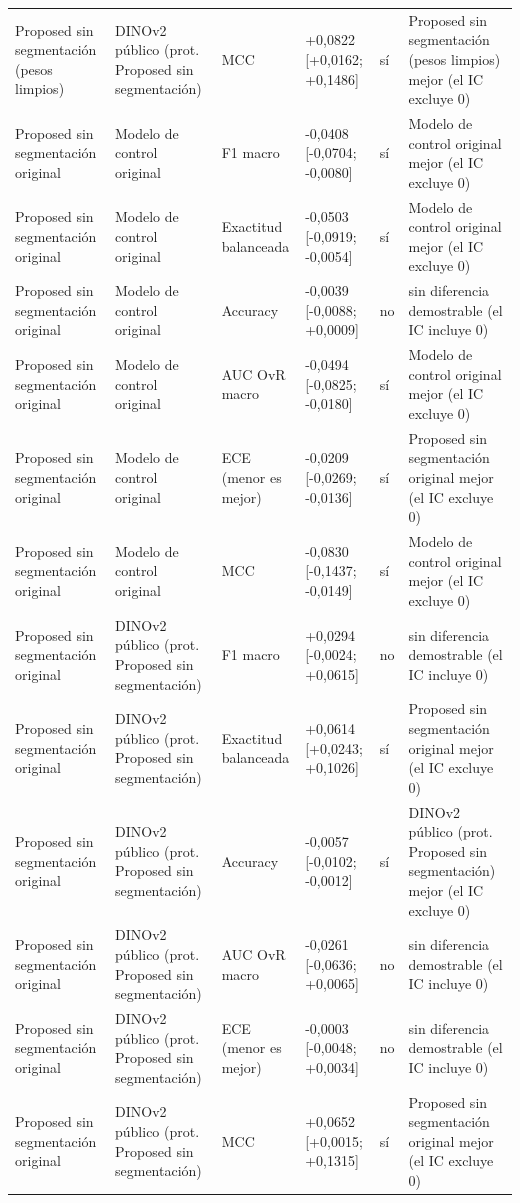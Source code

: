 \begin{longtable}{@{}llllll@{}}
Proposed sin segmentación (pesos limpios) & DINOv2 público (prot. Proposed sin segmentación) & MCC & +0,0822 [+0,0162; +0,1486] & sí & Proposed sin segmentación (pesos limpios) mejor (el IC excluye 0) \\
Proposed sin segmentación original & Modelo de control original & F1 macro & -0,0408 [-0,0704; -0,0080] & sí & Modelo de control original mejor (el IC excluye 0) \\
Proposed sin segmentación original & Modelo de control original & Exactitud balanceada & -0,0503 [-0,0919; -0,0054] & sí & Modelo de control original mejor (el IC excluye 0) \\
Proposed sin segmentación original & Modelo de control original & Accuracy & -0,0039 [-0,0088; +0,0009] & no & sin diferencia demostrable (el IC incluye 0) \\
Proposed sin segmentación original & Modelo de control original & AUC OvR macro & -0,0494 [-0,0825; -0,0180] & sí & Modelo de control original mejor (el IC excluye 0) \\
Proposed sin segmentación original & Modelo de control original & ECE (menor es mejor) & -0,0209 [-0,0269; -0,0136] & sí & Proposed sin segmentación original mejor (el IC excluye 0) \\
Proposed sin segmentación original & Modelo de control original & MCC & -0,0830 [-0,1437; -0,0149] & sí & Modelo de control original mejor (el IC excluye 0) \\
Proposed sin segmentación original & DINOv2 público (prot. Proposed sin segmentación) & F1 macro & +0,0294 [-0,0024; +0,0615] & no & sin diferencia demostrable (el IC incluye 0) \\
Proposed sin segmentación original & DINOv2 público (prot. Proposed sin segmentación) & Exactitud balanceada & +0,0614 [+0,0243; +0,1026] & sí & Proposed sin segmentación original mejor (el IC excluye 0) \\
Proposed sin segmentación original & DINOv2 público (prot. Proposed sin segmentación) & Accuracy & -0,0057 [-0,0102; -0,0012] & sí & DINOv2 público (prot. Proposed sin segmentación) mejor (el IC excluye 0) \\
Proposed sin segmentación original & DINOv2 público (prot. Proposed sin segmentación) & AUC OvR macro & -0,0261 [-0,0636; +0,0065] & no & sin diferencia demostrable (el IC incluye 0) \\
Proposed sin segmentación original & DINOv2 público (prot. Proposed sin segmentación) & ECE (menor es mejor) & -0,0003 [-0,0048; +0,0034] & no & sin diferencia demostrable (el IC incluye 0) \\
Proposed sin segmentación original & DINOv2 público (prot. Proposed sin segmentación) & MCC & +0,0652 [+0,0015; +0,1315] & sí & Proposed sin segmentación original mejor (el IC excluye 0) \\
\bottomrule
\end{longtable}
\endgroup

